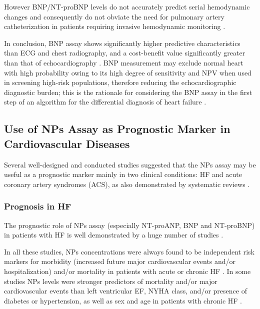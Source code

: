 \documentclass[14pt,a4paper,onecolumn]{extarticle}
\begin{document}
However BNP/NT-proBNP levels do not accurately predict serial hemodynamic changes and consequently do not obviate the need for pulmonary artery catheterization in patients requiring invasive hemodynamic monitoring \citep{bib3183}.

In conclusion, BNP assay shows significantly higher predictive characteristics than ECG and chest radiography, and a cost-benefit value significantly greater than that of echocardiography \citep{bib392} \citep{bib3170}. BNP measurement may exclude normal heart with high probability owing to its high degree of sensitivity and NPV when used in screening high-risk populations, therefore reducing the echocardiographic diagnostic burden; this is the rationale for considering the BNP assay in the first step of an algorithm for the differential diagnosis of heart failure \citep{bib337} \citep{bib365} \citep{bib369} \citep{bib370} \citep{bib3168} \citep{bib3175}.





\subsection{ Use of NPs Assay as Prognostic Marker in Cardiovascular Diseases}



Several well-designed and conducted studies suggested that the NPs assay may be useful as a prognostic marker mainly in two clinical conditions: HF and acute coronary artery syndromes (ACS), as also demonstrated by systematic reviews \citep{bib35} \citep{bib376} \citep{bib3184} \citep{bib3185}.



\subsubsection{ Prognosis in HF}



The prognostic role of NPs assay (especially NT-proANP, BNP and NT-proBNP) in patients with HF is well demonstrated by a huge number of studies \citep{bib316} \citep{bib3147} \citep{bib3186} \citep{bib3187} \citep{bib3188} \citep{bib3189} \citep{bib3190} \citep{bib3191} \citep{bib3192} \citep{bib3193} \citep{bib3194} \citep{bib3195} \citep{bib3206} \citep{bib3197} \citep{bib3198} \citep{bib3199}.



In all these studies, NPs concentrations were always found to be independent risk markers for morbidity (increased future major cardiovascular events and/or hospitalization) and/or mortality in patients with acute or chronic HF \citep{bib35}. In some studies NPs levels were stronger predictors of mortality and/or major cardiovascular events than left ventricular EF, NYHA class, and/or presence of diabetes or hypertension, as well as sex and age in patients with chronic HF \citep{bib3188} \citep{bib3189} \citep{bib3192} \citep{bib3194} \citep{bib3195} \citep{bib3206} \citep{bib3198} \citep{bib3199}.
\end{document}
